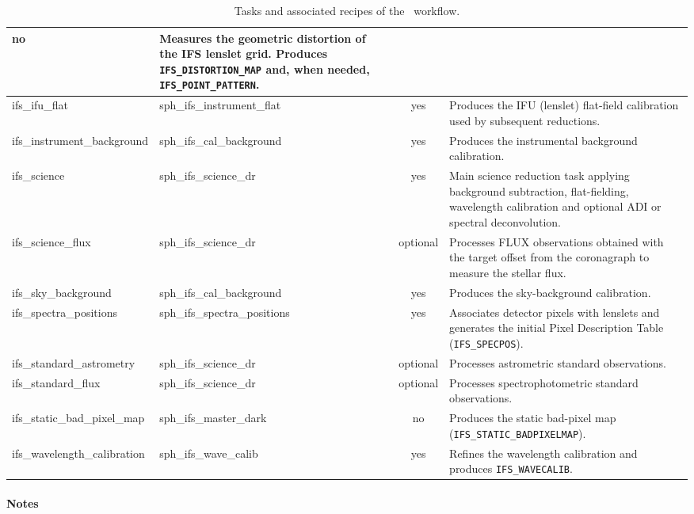 \begin{table}[htbp]
\begin{tabular}{|l|l|c|p{7cm}|}
no &
Measures the geometric distortion of the IFS lenslet grid. Produces \texttt{IFS\_DISTORTION\_MAP} and, when needed, \texttt{IFS\_POINT\_PATTERN}. \\
\hline
ifs\_ifu\_flat &
sph\_ifs\_instrument\_flat &
yes &
Produces the IFU (lenslet) flat-field calibration used by subsequent reductions. \\
\hline
ifs\_instrument\_background &
sph\_ifs\_cal\_background &
yes &
Produces the instrumental background calibration. \\
\hline
ifs\_science &
sph\_ifs\_science\_dr &
yes &
Main science reduction task applying background subtraction, flat-fielding, wavelength calibration and optional ADI or spectral deconvolution. \\
\hline
ifs\_science\_flux &
sph\_ifs\_science\_dr &
optional &
Processes FLUX observations obtained with the target offset from the coronagraph to measure the stellar flux. \\
\hline
ifs\_sky\_background &
sph\_ifs\_cal\_background &
yes &
Produces the sky-background calibration. \\
\hline
ifs\_spectra\_positions &
sph\_ifs\_spectra\_positions &
yes &
Associates detector pixels with lenslets and generates the initial Pixel Description Table (\texttt{IFS\_SPECPOS}). \\
\hline
ifs\_standard\_astrometry &
sph\_ifs\_science\_dr &
optional &
Processes astrometric standard observations. \\
\hline
ifs\_standard\_flux &
sph\_ifs\_science\_dr &
optional &
Processes spectrophotometric standard observations. \\
\hline
ifs\_static\_bad\_pixel\_map &
sph\_ifs\_master\_dark &
no &
Produces the static bad-pixel map (\texttt{IFS\_STATIC\_BADPIXELMAP}). \\
\hline
ifs\_wavelength\_calibration &
sph\_ifs\_wave\_calib &
yes &
Refines the wavelength calibration and produces \texttt{IFS\_WAVECALIB}. \\
\hline
\end{tabular}
\caption{Tasks and associated recipes of the \instname\ workflow.}
\label{tab:ifs_workflow_tasks}
\end{table}


\paragraph{Notes}

